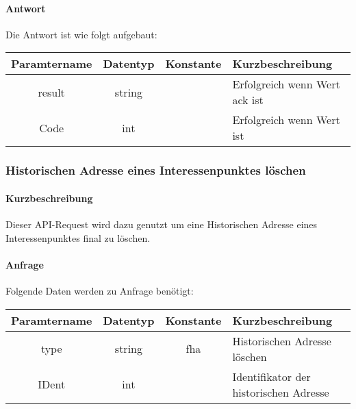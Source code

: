 \paragraph{Antwort}Die Antwort ist wie folgt aufgebaut:
\begin{table}[H]
	\begin{tabular}{|c|c|c|p{6.5cm}|}
		\hline
		\textbf{Paramtername} & \textbf{Datentyp} & \textbf{Konstante} & \textbf{Kurzbeschreibung}                                                                                               \\ \hline
		result              & string           &                 & Erfolgreich wenn Wert {\glqq ack\grqq} ist \\ \hline
		Code                & int              &                 & Erfolgreich wenn Wert {\glqq 0\grqq} ist \\ \hline
	\end{tabular}
\end{table}
\subsubsection{Historischen Adresse eines Interessenpunktes löschen}
\paragraph{Kurzbeschreibung}Dieser API-Request wird dazu genutzt um eine Historischen Adresse eines Interessenpunktes final zu löschen.
\paragraph{Anfrage}Folgende Daten werden zu Anfrage benötigt:
\begin{table}[H]
	\begin{tabular}{|c|c|c|p{6.5cm}|}
		\hline
		\textbf{Paramtername} & \textbf{Datentyp} & \textbf{Konstante} & \textbf{Kurzbeschreibung}                                                                                               \\ \hline
		type                & string            & fha                & Historischen Adresse löschen \\ \hline
		IDent               & int               &                    & Identifikator der historischen Adresse \\ \hline
	\end{tabular}
\end{table}
